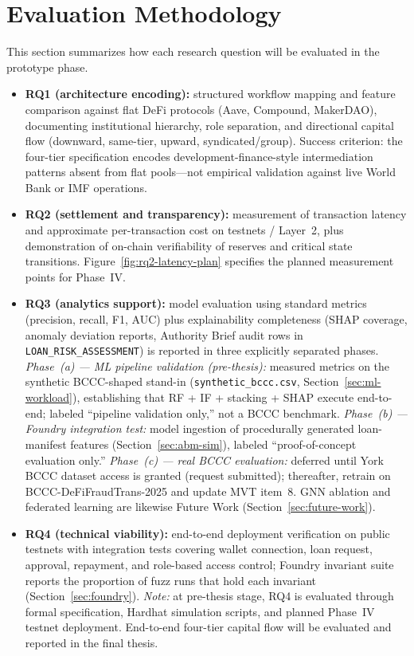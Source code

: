 \documentclass[12pt,a4paper]{report}
\begin{document}
\section{Evaluation Methodology}
\label{sec:eval-method}

This section summarizes how each research question will be evaluated in the prototype phase.
\begin{itemize}[noitemsep]
\item \textbf{RQ1 (architecture encoding):} structured workflow mapping and feature comparison against flat DeFi protocols (Aave, Compound, MakerDAO), documenting institutional hierarchy, role separation, and directional capital flow (downward, same-tier, upward, syndicated/group). Success criterion: the four-tier specification encodes development-finance-style intermediation patterns absent from flat pools---not empirical validation against live World Bank or IMF operations.
\item \textbf{RQ2 (settlement and transparency):} measurement of transaction latency and approximate per-transaction cost on testnets / Layer~2, plus demonstration of on-chain verifiability of reserves and critical state transitions. Figure~\ref{fig:rq2-latency-plan} specifies the planned measurement points for Phase~IV.
\item \textbf{RQ3 (analytics support):} model evaluation using standard metrics (precision, recall, F1, AUC) plus explainability completeness (SHAP coverage, anomaly deviation reports, Authority Brief audit rows in \texttt{LOAN\_RISK\_ASSESSMENT}) is reported in three explicitly separated phases. \textit{Phase~(a) --- ML pipeline validation (pre-thesis):} measured metrics on the synthetic BCCC-shaped stand-in (\texttt{synthetic\_bccc.csv}, Section~\ref{sec:ml-workload}), establishing that RF + IF + stacking + SHAP execute end-to-end; labeled ``pipeline validation only,'' not a BCCC benchmark. \textit{Phase~(b) --- Foundry integration test:} model ingestion of procedurally generated loan-manifest features (Section~\ref{sec:abm-sim}), labeled ``proof-of-concept evaluation only.'' \textit{Phase~(c) --- real BCCC evaluation:} deferred until York BCCC dataset access is granted (request submitted); thereafter, retrain on BCCC-DeFiFraudTrans-2025 and update MVT item~8. GNN ablation and federated learning are likewise Future Work (Section~\ref{sec:future-work}).
\item \textbf{RQ4 (technical viability):} end-to-end deployment verification on public testnets with integration tests covering wallet connection, loan request, approval, repayment, and role-based access control; Foundry invariant suite reports the proportion of fuzz runs that hold each invariant (Section~\ref{sec:foundry}). \textit{Note:} at pre-thesis stage, RQ4 is evaluated through formal specification, Hardhat simulation scripts, and planned Phase~IV testnet deployment. End-to-end four-tier capital flow will be evaluated and reported in the final thesis.

\end{itemize}
\end{document}
